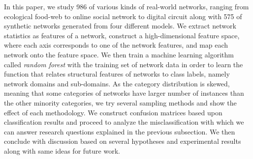 In this paper, we study 986 of various kinds of real-world networks, ranging from ecological food-web to online social network to digital circuit along with 575 of synthetic networks generated from four different models. We extract network statistics as features of a network, construct a high-dimensional feature space, where each axis corresponds to one of the network features, and map each network onto the feature space. We then train a machine learning algorithm called \textit{random forest} with the training set of network data in order to learn the function that relates structural features of networks to class labels, namely network domains and sub-domains. As the category distribution is skewed, meaning that some categories of networks have larger number of instances than the other minority categories, we try several sampling methods and show the effect of each methodology. We construct confusion matrices based upon classification results and proceed to analyze the misclassification with which we can answer research questions explained in the previous subsection. We then conclude with discussion based on several hypotheses and experimental results along with same ideas for future work.
